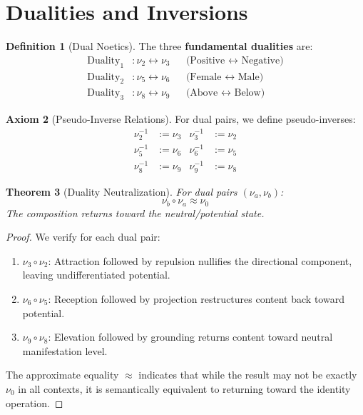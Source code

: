 \documentclass[11pt,twoside,openright]{book}
\theoremstyle{definition}
\newtheorem{definition}{Definition}[chapter]
\newtheorem{axiom}[definition]{Axiom}
\theoremstyle{plain}
\newtheorem{theorem}[definition]{Theorem}
\theoremstyle{remark}
\newcommand{\noe}[1]{\nu_{#1}}
\begin{document}
\section{Dualities and Inversions}

\begin{definition}[Dual Noetics]
\label{def:dual-noetics}
The three \textbf{fundamental dualities} are:
\begin{align}
\text{Duality}_1 &: \noe{2} \leftrightarrow \noe{3} && \text{(Positive } \leftrightarrow \text{ Negative)} \\
\text{Duality}_2 &: \noe{5} \leftrightarrow \noe{6} && \text{(Female } \leftrightarrow \text{ Male)} \\
\text{Duality}_3 &: \noe{8} \leftrightarrow \noe{9} && \text{(Above } \leftrightarrow \text{ Below)}
\end{align}
\end{definition}

\begin{axiom}[Pseudo-Inverse Relations]
\label{ax:pseudo-inverse}
For dual pairs, we define pseudo-inverses:
\begin{align}
\noe{2}^{-1} &:= \noe{3} & \noe{3}^{-1} &:= \noe{2} \\
\noe{5}^{-1} &:= \noe{6} & \noe{6}^{-1} &:= \noe{5} \\
\noe{8}^{-1} &:= \noe{9} & \noe{9}^{-1} &:= \noe{8}
\end{align}
\end{axiom}

\begin{theorem}[Duality Neutralization]
\label{thm:duality-neutral}
For dual pairs $(\noe{a}, \noe{b})$:
\[
\noe{b} \circ \noe{a} \approx \noe{0}
\]
The composition returns toward the neutral/potential state.
\end{theorem}

\begin{proof}
We verify for each dual pair:
\begin{enumerate}
  \item $\noe{3} \circ \noe{2}$: Attraction followed by repulsion nullifies the directional component, leaving undifferentiated potential.
  \item $\noe{6} \circ \noe{5}$: Reception followed by projection restructures content back toward potential.
  \item $\noe{9} \circ \noe{8}$: Elevation followed by grounding returns content toward neutral manifestation level.
\end{enumerate}
The approximate equality $\approx$ indicates that while the result may not be exactly $\noe{0}$ in all contexts, it is semantically equivalent to returning toward the identity operation.
\end{proof}
\end{document}
